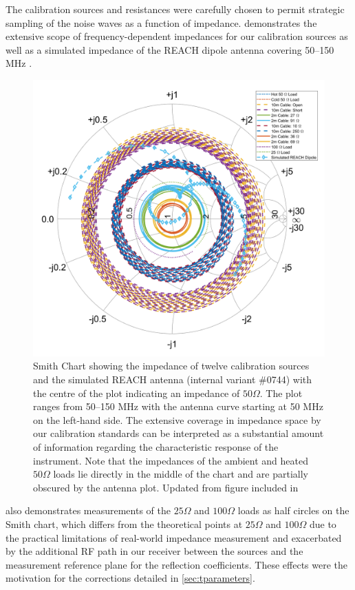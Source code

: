 The calibration sources and resistances were carefully chosen to permit strategic sampling of the noise waves as a function of impedance.  demonstrates the extensive scope of frequency-dependent impedances for our calibration sources as well as a simulated impedance of the REACH dipole antenna covering 50--150 MHz \citep{john_antenna}.
\begin{figure}[t]
    \centering
    \includegraphics[scale=0.3]{smith}
    \caption{Smith Chart showing the impedance of twelve calibration sources and the simulated REACH antenna (internal variant \#0744) with the centre of the plot indicating an impedance of $50 \Omega$. The plot ranges from 50--150 MHz with the antenna curve starting at 50 MHz on the left-hand side. The extensive coverage in impedance space by our calibration standards can be interpreted as a substantial amount of information regarding the characteristic response of the instrument. Note that the impedances of the ambient and heated $50 \Omega$ loads lie directly in the middle of the chart and are partially obscured by the antenna plot. Updated from figure included in \citet{reach}}
    \label{fig:smith}
\end{figure}
 also demonstrates measurements of the $25 \Omega$ and $100 \Omega$ loads as half circles on the Smith chart, which differs from the theoretical points at $25 \Omega$ and $100 \Omega$ due to the practical limitations of real-world impedance measurement and exacerbated by the additional RF path in our receiver between the sources and the measurement reference plane for the reflection coefficients. These effects were the motivation for the corrections detailed in \cref{sec:tparameters}.

